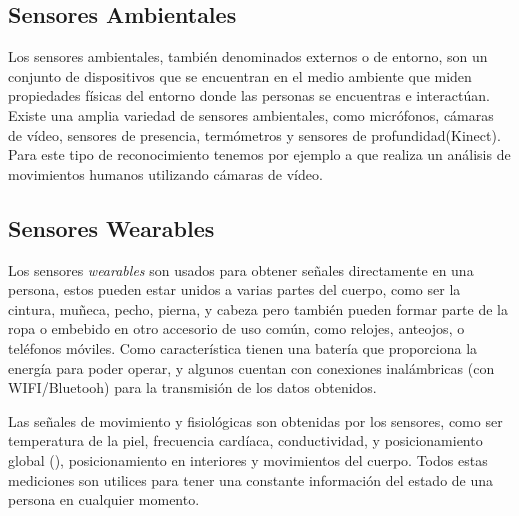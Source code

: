 \subsection{Sensores Ambientales}

Los sensores ambientales, también denominados externos o de entorno,
son un conjunto de dispositivos que se encuentran en el medio ambiente
que miden propiedades físicas del entorno donde las personas se encuentras
e interactúan. Existe una amplia variedad de sensores ambientales,
como micrófonos, cámaras de vídeo, sensores de presencia, termómetros
y sensores de profundidad(Kinect). Para este tipo de reconocimiento
tenemos por ejemplo a \cite{Poppe2007} que realiza un análisis de
movimientos humanos utilizando cámaras de vídeo.

\subsection{Sensores Wearables}

Los sensores \emph{wearables} son usados para obtener señales directamente
en una persona, estos pueden estar unidos a varias partes del cuerpo,
como ser la cintura, muñeca, pecho, pierna, y cabeza \cite{Bao2004}
pero también pueden formar parte de la ropa o embebido en otro accesorio
de uso común, como relojes, anteojos, o teléfonos móviles. Como característica
tienen una batería que proporciona la energía para poder operar, y
algunos cuentan con conexiones inalámbricas (con WIFI/Bluetooh) para
la transmisión de los datos obtenidos.

Las señales de movimiento y fisiológicas son obtenidas por los sensores,
como ser temperatura de la piel, frecuencia cardíaca, conductividad,
y posicionamiento global (), posicionamiento en interiores
y movimientos del cuerpo. Todos estas mediciones son utilices para
tener una constante información del estado de una persona en cualquier
momento.

